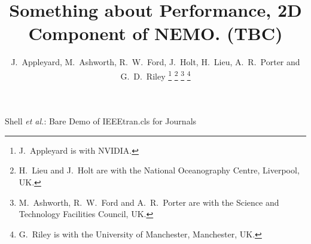 \documentclass[journal]{IEEEtran}
\begin{document}
%
\title{Something about Performance, 2D Component of NEMO. (TBC)}
%
%

\author{J.~Appleyard, M.~Ashworth, R.~W.~Ford, J.~Holt, H.~Lieu, A.~R.~Porter and G.~D.~Riley%
\thanks{J.~Appleyard is with NVIDIA.}%
\thanks{H.~Lieu and J.~Holt are with the National Oceanography Centre, Liverpool, UK.}%
\thanks{M.~Ashworth, R.~W.~Ford and A.~R.~Porter are with the Science and Technology Facilities Council, UK.}%
\thanks{G.~Riley is with the University of Manchester, Manchester, UK.}%
}

% 
%


%
{Shell \MakeLowercase{\textit{et al.}}: Bare Demo of IEEEtran.cls for Journals}
% 




\end{document}
